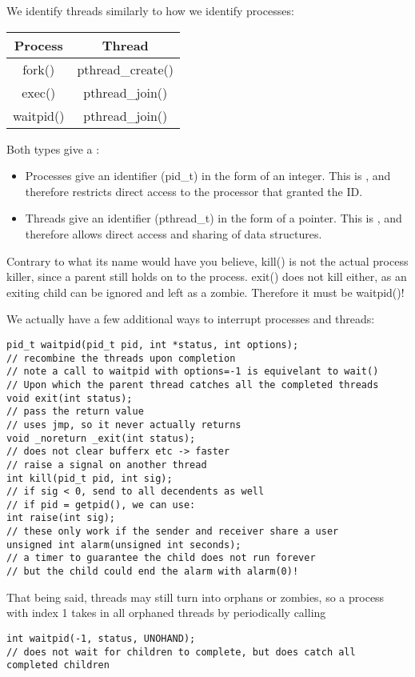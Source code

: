 \documentclass[../../lecture_notes.tex]{subfiles}
\begin{document}
We identify threads similarly to how we identify processes:
\begin{table} \centering
\begin{tabular} { c | c } 
	\textbf{Process} & \textbf{Thread} \\
	\hline
	fork() & pthread\_create() \\
	exec() & pthread\_join() \\
	waitpid() & pthread\_join() 
\end{tabular}
\end{table}
Both types give a :
\begin{itemize}
\item Processes give an identifier (pid\_t) in the form of an integer. This is , and therefore restricts direct access to the processor that granted the ID.
\item Threads give an identifier (pthread\_t) in the form of a pointer. This is , and therefore allows direct access and sharing of data structures.
\end{itemize}


Contrary to what its name would have you believe, kill() is not the actual process killer, since a parent still holds on to the process. exit() does not kill either, as an exiting child can be ignored and left as a zombie. Therefore it must be waitpid()!


We actually have a few additional ways to interrupt processes and threads:
\begin{lstlisting}
pid_t waitpid(pid_t pid, int *status, int options);
// recombine the threads upon completion
// note a call to waitpid with options=-1 is equivelant to wait()
// Upon which the parent thread catches all the completed threads
void exit(int status);
// pass the return value
// uses jmp, so it never actually returns
void _noreturn _exit(int status);
// does not clear bufferx etc -> faster
// raise a signal on another thread
int kill(pid_t pid, int sig); 
// if sig < 0, send to all decendents as well
// if pid = getpid(), we can use:
int raise(int sig);
// these only work if the sender and receiver share a user
unsigned int alarm(unsigned int seconds);
// a timer to guarantee the child does not run forever
// but the child could end the alarm with alarm(0)!
\end{lstlisting}


That being said, threads may still turn into orphans or zombies, so a process with index 1 takes in all orphaned threads by periodically calling
\begin{lstlisting}
int waitpid(-1, status, UNOHAND);
// does not wait for children to complete, but does catch all completed children
\end{lstlisting}
\end{document}
